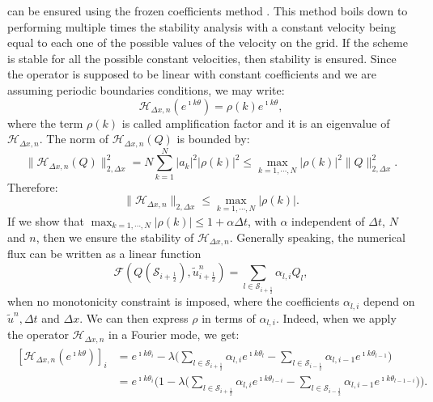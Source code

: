 can be ensured using the frozen coefficients method \citep[p.~59]{strikwerda:2004}.
This method boils down to performing multiple times the stability analysis with a constant velocity
being equal to each one of the possible values of the velocity on the grid.
If the scheme is stable for all the possible constant velocities, then stability is ensured.
Since the operator is supposed to be linear with constant coefficients and we
are assuming periodic boundaries conditions, we may write:
\begin{equation*}
	\mathcal{H}_{\Delta x,n}(e^{\imath k \theta}) = \rho(k)  e^{\imath k \theta},
\end{equation*}
where the term $\rho(k)$ is called amplification factor and it is an eigenvalue of $\mathcal{H}_{\Delta x,n}$.
The norm of $\mathcal{H}_{\Delta x,n}(Q)$ is bounded by:
\begin{equation*}
	\|\mathcal{H}_{\Delta x,n}(Q)\|_{2,\Delta x}^2 = N \sum_{k=1}^{N} |a_k|^2 |\rho(k)|^2 \leq 
	\max_{k=1, \cdots, N}{|\rho(k)|}^2 \|Q\|_{2,\Delta x}^2.
\end{equation*}
Therefore:
\begin{equation*}
	\|\mathcal{H}_{\Delta x,n}\|_{2,\Delta x} \leq \max_{k=1, \cdots, N}{|\rho(k)|}.
\end{equation*}
If we show that $\max_{k=1, \cdots, N}{|\rho(k)|} \leq 1 + \alpha \Delta t$, 
with $\alpha$ independent of $\Delta t$, $N$ and $n$, then we ensure the stability of $\mathcal{H}_{\Delta x,n}$.
Generally speaking, the numerical flux can be written as a linear function
\begin{equation*}
	\mathcal{F}(Q(\mathcal{S}_{i+\frac{1}{2}}), \tilde{u}^n_{i+\frac{1}{2}}) = \sum_{l \in \mathcal{S}_{i+\frac{1}{2}}} \alpha_{l,i} Q_{l}, 
\end{equation*}
when no monotonicity constraint is imposed, 
where the coefficients $\alpha_{l,i}$ depend on $\tilde{u}^n, \Delta t$ and $\Delta x$.
We can then express $\rho$ in terms of $\alpha_{l,i}$.
Indeed, when we apply the operator $\mathcal{H}_{\Delta x,n}$ in a Fourier mode, we get:
\begin{align*}
	\begin{split}
		[\mathcal{H}_{\Delta x,n}(e^{\imath k\theta})]_i &= e^{\imath k\theta_i} - \lambda 
		\bigg(\sum_{l \in \mathcal{S}_{i+\frac{1}{2}}} \alpha_{l,i}   e^{\imath k\theta_{l}} - 
		\sum_{l \in \mathcal{S}_{i-\frac{1}{2}}} \alpha_{l,i-1} e^{\imath k\theta_{l-1}} \bigg)\\
		&= e^{\imath k \theta_i}\bigg(1 - \lambda 
		\bigg(\sum_{l \in \mathcal{S}_{i+\frac{1}{2}}} \alpha_{l,i}   e^{\imath k\theta_{l-i}} - 
		\sum_{l \in \mathcal{S}_{i-\frac{1}{2}}} \alpha_{l,i-1} e^{\imath k\theta_{l-1-i}} \bigg) \bigg).\\
	\end{split}
\end{align*}

